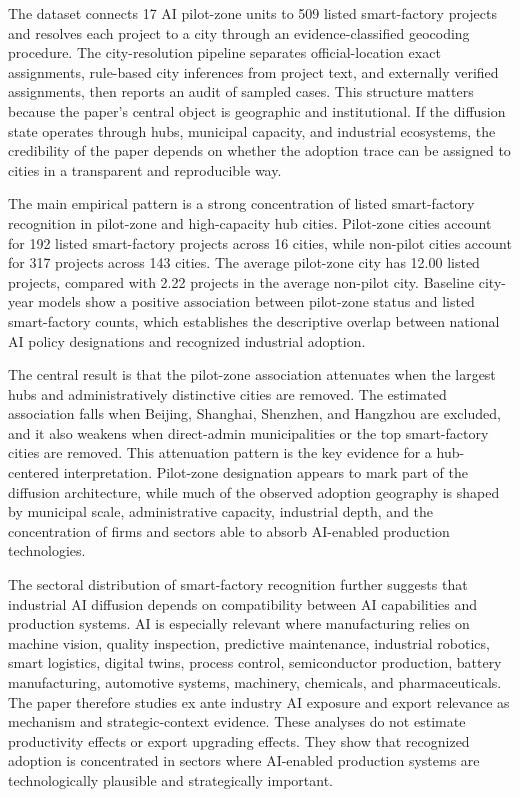 \documentclass[12pt]{article}
\begin{document}
The dataset connects 17 AI pilot-zone units to 509 listed smart-factory projects and resolves each project to a city through an evidence-classified geocoding procedure. The city-resolution pipeline separates official-location exact assignments, rule-based city inferences from project text, and externally verified assignments, then reports an audit of sampled cases. This structure matters because the paper's central object is geographic and institutional. If the diffusion state operates through hubs, municipal capacity, and industrial ecosystems, the credibility of the paper depends on whether the adoption trace can be assigned to cities in a transparent and reproducible way.

The main empirical pattern is a strong concentration of listed smart-factory recognition in pilot-zone and high-capacity hub cities. Pilot-zone cities account for 192 listed smart-factory projects across 16 cities, while non-pilot cities account for 317 projects across 143 cities. The average pilot-zone city has 12.00 listed projects, compared with 2.22 projects in the average non-pilot city. Baseline city-year models show a positive association between pilot-zone status and listed smart-factory counts, which establishes the descriptive overlap between national AI policy designations and recognized industrial adoption.

The central result is that the pilot-zone association attenuates when the largest hubs and administratively distinctive cities are removed. The estimated association falls when Beijing, Shanghai, Shenzhen, and Hangzhou are excluded, and it also weakens when direct-admin municipalities or the top smart-factory cities are removed. This attenuation pattern is the key evidence for a hub-centered interpretation. Pilot-zone designation appears to mark part of the diffusion architecture, while much of the observed adoption geography is shaped by municipal scale, administrative capacity, industrial depth, and the concentration of firms and sectors able to absorb AI-enabled production technologies.

The sectoral distribution of smart-factory recognition further suggests that industrial AI diffusion depends on compatibility between AI capabilities and production systems. AI is especially relevant where manufacturing relies on machine vision, quality inspection, predictive maintenance, industrial robotics, smart logistics, digital twins, process control, semiconductor production, battery manufacturing, automotive systems, machinery, chemicals, and pharmaceuticals. The paper therefore studies ex ante industry AI exposure and export relevance as mechanism and strategic-context evidence. These analyses do not estimate productivity effects or export upgrading effects. They show that recognized adoption is concentrated in sectors where AI-enabled production systems are technologically plausible and strategically important.
\end{document}

